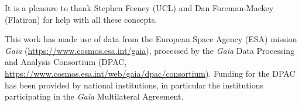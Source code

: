 \documentclass[modern]{aastex63}
\begin{document}
\acknowledgments

It is a pleasure to thank
  Stephen Feeney (UCL)
  and
  Dan Foreman-Mackey (Flatiron)
for help with all these concepts.

This work has made use of data from the European Space Agency (ESA) mission
{\it Gaia} (\url{https://www.cosmos.esa.int/gaia}), processed by the {\it Gaia}
Data Processing and Analysis Consortium (DPAC,
\url{https://www.cosmos.esa.int/web/gaia/dpac/consortium}). Funding for the DPAC
has been provided by national institutions, in particular the institutions
participating in the {\it Gaia} Multilateral Agreement.

\software{
}







\end{document}
